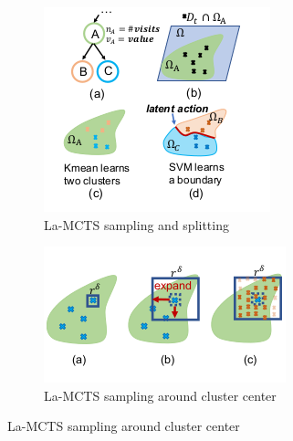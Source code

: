 \documentclass[bibliography=totoc]{scrartcl}
\begin{document}
\begin{figure}[h!]
    \centering
    \begin{subfigure}[b]{0.3\linewidth}
    \includegraphics[width=\textwidth]{img/lamcts_1.png}
    \caption{La-MCTS sampling and splitting \cite{DBLP:journals/corr/abs-2007-00708}}
    \label{fig:mesh1}
    \end{subfigure}
    \hspace{0.02\textwidth}
    \begin{subfigure}[b]{0.3\linewidth}
    \centering
    \includegraphics[width=\textwidth]{img/lamcts_2.png}
    \caption{La-MCTS sampling around cluster center \cite{DBLP:journals/corr/abs-2007-00708}}
    \label{fig:mesh1}
    \end{subfigure}
\end{figure}
\end{document}
